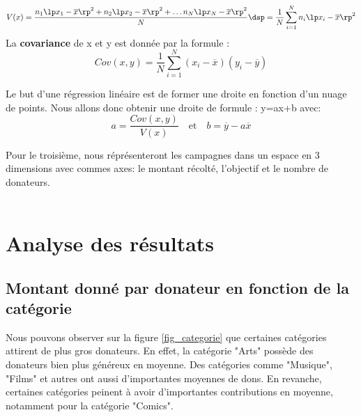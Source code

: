 \documentclass{article}
\begin{document}
\[

V(x)=\dfrac{n_1\lp x_1-\overline{x}\rp^2+n_2\lp x_2-\overline{x}\rp^2+\dots
n_N\lp x_N-\overline{x}\rp^2}{N}
\dsp=\dfrac{1}{N}\sum_{i=1}^N n_i\lp x_i-\overline{x}\rp^2
\]
\vspace{0.3cm}
La {\bf covariance} de x et y est donnée par la formule :
\vspace{0.3cm}
\[
Cov(x,y)=\dfrac{1}{N}\sum_{i=1}^N (x_i-\overline{x})(y_i-\overline{y})
\]
\vspace{0.3cm}

Le but d'une régression linéaire est de former une droite en fonction d'un nuage de points. Nous allons donc obtenir une droite de formule : y=ax+b avec: \\
\[
    a=\dfrac{Cov(x,y)}{V(x)} \quad \text{et} \quad b=\overline{y}-a\overline{x}
\]
\vspace{0.3cm}

\tabto{1cm} Pour le troisième, nous réprésenteront les campagnes dans un espace en 3 dimensions avec commes axes: le montant récolté, l'objectif et le nombre de donateurs.
\\
\\

\section{Analyse des résultats}
\label{analyse}

\subsection{Montant donné par donateur en fonction de la catégorie}
\label{devise}
Nous pouvons observer sur la figure \ref{fig_categorie} que certaines catégories attirent de plus gros donateurs. En effet, la catégorie "Arts" possède des donateurs bien plus généreux en moyenne. Des catégories comme "Musique", "Films" et autres ont aussi d'importantes moyennes de dons. 
En revanche, certaines catégories peinent à avoir d'importantes contributions en moyenne, notamment pour la catégorie "Comics".
\end{document}

